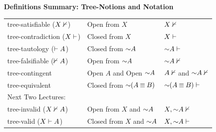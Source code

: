 \documentclass[options]{philosophersimprint}
\begin{document}
\begin{framed}
\noindent\textbf{Definitions Summary: Tree-Notions and Notation}\\
\begin{tabular}{l | l | l}%
tree-satisfiable ($X\nvdash$) & Open from $X$ & $X\nvdash$ \\
tree-contradiction ($X\vdash$) & Closed from $X$ & $X\vdash$\\
tree-tautology ($\vdash A$) & Closed from $\mathord{\sim} A$ & $\mathord{\sim} A\vdash$\\
tree-falsifiable ($\nvdash A$) & Open from $\mathord{\sim} A$ & $\mathord{\sim} A\nvdash$\\
tree-contingent & Open $A$ and Open $\mathord{\sim} A$ & $A\nvdash$ and $\mathord{\sim} A\nvdash$\\
tree-equivalent & Closed from $\mathord{\sim}(A\mathbin{\equiv} B)$ & $\mathord{\sim}(A\mathbin{\equiv} B)\vdash$\\
\hline
Next Two Lectures: & & \\
tree-invalid ($X\nvdash A$) & Open from $X$ and $\mathord{\sim} A$& $X,\mathord{\sim} A\nvdash$\\
tree-valid ($X\vdash A$) & Closed from $X$ and $\mathord{\sim} A$ & $X,\mathord{\sim} A\vdash$
\end{tabular}
\end{framed}
\end{document}
